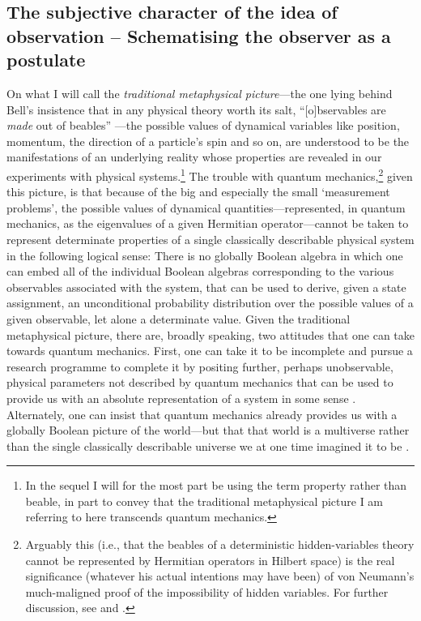 \documentclass[12pt,english,twoside]{article}
\numberwithin{equation}{section}
\begin{document}


\subsection{The subjective character of the idea of observation -- Schematising the observer as a postulate}
\label{sec:subjective_character}

On what I will call the \emph{traditional metaphysical picture}---the one lying behind Bell's insistence that in any physical theory worth its salt, ``[o]bservables are \emph{made} out of beables'' \citep[p. 41, emphasis in original]{bell1973}---the possible values of dynamical variables like position, momentum, the direction of a particle's spin and so on, are understood to be the manifestations of an underlying reality whose properties are revealed in our experiments with physical systems.\footnote{In the sequel I will for the most part be using the term property rather than beable, in part to convey that the traditional metaphysical picture I am referring to here transcends quantum mechanics.} The trouble with quantum mechanics,\footnote{Arguably this (i.e., that the beables of a deterministic hidden-variables theory cannot be represented by Hermitian operators in Hilbert space) is the real significance (whatever his actual intentions may have been) of von Neumann's much-maligned proof of the impossibility of hidden variables. For further discussion, see \citet{bub2010} and \citet{dieks2017}.} given this picture, is that because of the big and especially the small `measurement problems', the possible values of dynamical quantities---represented, in quantum mechanics, as the eigenvalues of a given Hermitian operator---cannot be taken to represent determinate properties of a single classically describable physical system in the following logical sense: There is no globally Boolean algebra in which one can embed all of the individual Boolean algebras corresponding to the various observables associated with the system, that can be used to derive, given a state assignment, an unconditional probability distribution over the possible values of a given observable, let alone a determinate value. Given the traditional metaphysical picture, there are, broadly speaking, two attitudes that one can take towards quantum mechanics. First, one can take it to be incomplete and pursue a research programme to complete it by positing further, perhaps unobservable, physical parameters not described by quantum mechanics that can be used to provide us with an absolute representation of a system in some sense \citep[see, e.g.,][]{ghirardi2018, goldstein2006}. Alternately, one can insist that quantum mechanics already provides us with a globally Boolean picture of the world---but that that world is a multiverse rather than the single classically describable universe we at one time imagined it to be \citep[see][]{vaidman2018}.
\end{document}
